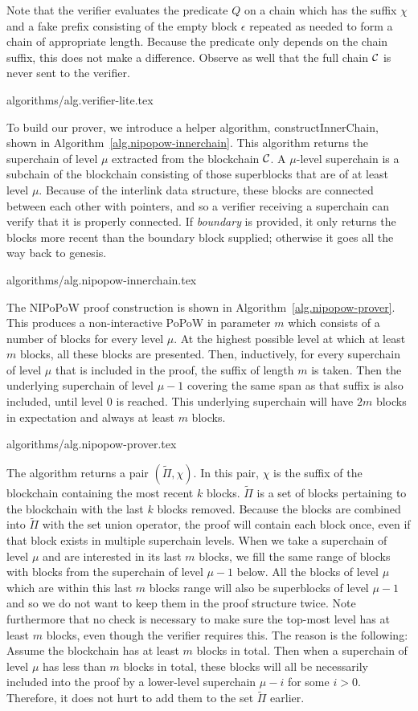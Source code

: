 Note that the verifier evaluates the predicate $Q$ on a chain which has the
suffix $\chi$ and a fake prefix consisting of the empty block $\epsilon$
repeated as needed to form a chain of appropriate length. Because the predicate
only depends on the chain suffix, this does not make a difference. Observe as
well that the full chain $\mathcal{C}$ is never sent to the verifier.

{algorithms/alg.verifier-lite.tex}

To build our prover, we introduce a helper algorithm, constructInnerChain,
shown in Algorithm~\ref{alg.nipopow-innerchain}. This algorithm returns the
superchain of level $\mu$ extracted from the blockchain $\mathcal{C}$. A
$\mu$-level superchain is a subchain of the blockchain consisting of those
superblocks that are of at least level $\mu$. Because of the interlink data
structure, these blocks are connected between each other with pointers, and so
a verifier receiving a superchain can verify that it is properly connected.
If \textit{boundary} is provided, it only returns the blocks more recent than
the boundary block supplied; otherwise it goes all the way back to genesis.

{algorithms/alg.nipopow-innerchain.tex}

The NIPoPoW proof construction is shown in Algorithm~\ref{alg.nipopow-prover}.
This produces a non-interactive PoPoW in parameter $m$ which consists of a
number of blocks for every level $\mu$. At the highest possible level at which
at least $m$ blocks, all these blocks are presented. Then, inductively, for
every superchain of level $\mu$ that is included in the proof, the suffix of
length $m$ is taken. Then the underlying superchain of level $\mu - 1$ covering
the same span as that suffix is also included, until level $0$ is reached. This
underlying superchain will have $2m$ blocks in expectation and always at least
$m$ blocks.

{algorithms/alg.nipopow-prover.tex}

The algorithm returns a pair $(\tilde\Pi, \chi)$. In this pair, $\chi$ is the
suffix of the blockchain containing the most recent $k$ blocks. $\tilde\Pi$ is
a set of blocks pertaining to the blockchain with the last $k$ blocks removed.
Because the blocks are combined into $\tilde\Pi$ with the set union operator,
the proof will contain each block once, even if that block exists in multiple
superchain levels. When we take a superchain of level $\mu$ and are interested
in its last $m$ blocks, we fill the same range of blocks with blocks from the
superchain of level $\mu - 1$ below.  All the blocks of level $\mu$ which are
within this last $m$ blocks range will also be superblocks of level $\mu - 1$
and so we do not want to keep them in the proof structure twice.  Note
furthermore that no check is necessary to make sure the top-most level has at
least $m$ blocks, even though the verifier requires this. The reason is the
following: Assume the blockchain has at least $m$ blocks in total. Then when a
superchain of level $\mu$ has less than $m$ blocks in total, these blocks will
all be necessarily included into the proof by a lower-level superchain $\mu -
i$ for some $i > 0$.  Therefore, it does not hurt to add them to the set
$\tilde\Pi$ earlier.

